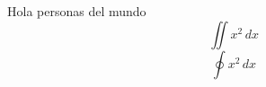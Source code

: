 
    Hola personas del mundo 
    \[
         \iint x^2 \, dx    
    \]
    \begin{equation}
        \oint x^2 \, dx
    \end{equation}
